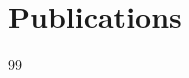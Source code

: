 {}
\chapter*{Publications}

\begin{refsection}[ownpubs]
    \small
    \nocite{*} %
    { %
      \expandafter\def\csname blx@maxbibnames\endcsname{99}%
      \printbibliography[heading=none]
    }
\end{refsection}

